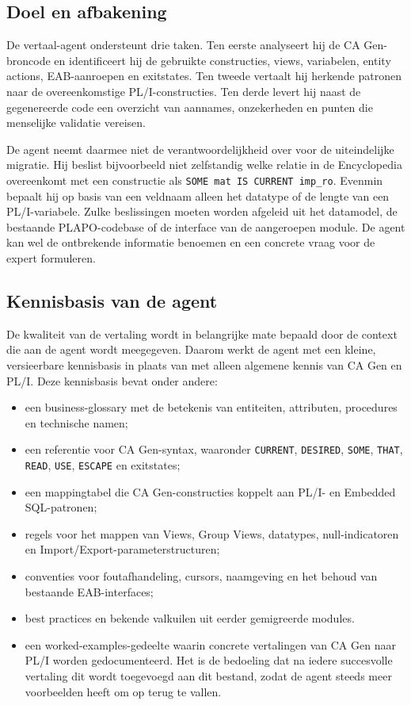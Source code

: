 \subsection{Doel en afbakening}
\label{sec:doel-afbakening-vertaal-agent}

De vertaal-agent ondersteunt drie taken. Ten eerste analyseert hij de
CA Gen-broncode en identificeert hij de gebruikte constructies, views,
variabelen, entity actions, EAB-aanroepen en exitstates. Ten tweede vertaalt
hij herkende patronen naar de overeenkomstige PL/I-constructies. Ten derde
levert hij naast de gegenereerde code een overzicht van aannames,
onzekerheden en punten die menselijke validatie vereisen.

De agent neemt daarmee niet de verantwoordelijkheid over voor de uiteindelijke
migratie. Hij beslist bijvoorbeeld niet zelfstandig welke relatie in de
Encyclopedia overeenkomt met een constructie als \texttt{SOME mat IS CURRENT
imp\_ro}. Evenmin bepaalt hij op basis van een veldnaam alleen het datatype of
de lengte van een PL/I-variabele. Zulke beslissingen moeten worden afgeleid uit
het datamodel, de bestaande PLAPO-codebase of de interface van de aangeroepen
module. De agent kan wel de ontbrekende informatie benoemen en een concrete
vraag voor de expert formuleren.

\subsection{Kennisbasis van de agent}
\label{sec:kennisbasis-vertaal-agent}

De kwaliteit van de vertaling wordt in belangrijke mate bepaald door de
context die aan de agent wordt meegegeven. Daarom werkt de agent met een
kleine, versieerbare kennisbasis in plaats van met alleen algemene kennis van
CA Gen en PL/I. Deze kennisbasis bevat onder andere:
\begin{itemize}
    \item een business-glossary met de betekenis van entiteiten, attributen,
    procedures en technische namen;
    \item een referentie voor CA Gen-syntax, waaronder \texttt{CURRENT},
    \texttt{DESIRED}, \texttt{SOME}, \texttt{THAT}, \texttt{READ},
    \texttt{USE}, \texttt{ESCAPE} en exitstates;
    \item een mappingtabel die CA Gen-constructies koppelt aan PL/I- en
    Embedded SQL-patronen;
    \item regels voor het mappen van Views, Group Views, datatypes,
    null-indicatoren en Import/Export-parameterstructuren;
    \item conventies voor foutafhandeling, cursors, naamgeving en het behoud
    van bestaande EAB-interfaces;
    \item best practices en bekende valkuilen uit eerder gemigreerde modules.
    \item een worked-examples-gedeelte waarin concrete vertalingen van CA Gen naar PL/I worden gedocumenteerd. Het is de
    bedoeling dat na iedere succesvolle vertaling dit wordt toegevoegd aan dit bestand, zodat de agent steeds meer voorbeelden heeft om op terug te vallen.
\end{itemize}

